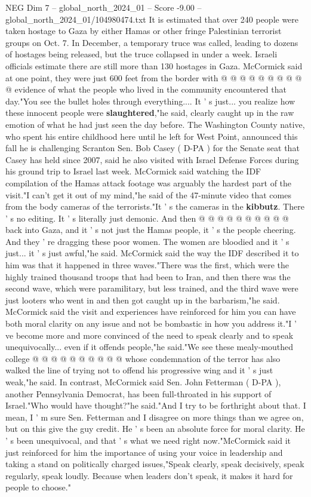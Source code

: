 \begin{textsample}{NEG Dim 7 – global\_north\_2024\_01 – Score -9.00 – global\_north\_2024\_01/104980474.txt}
It is estimated that over 240 people were taken hostage to Gaza by either Hamas or other fringe Palestinian terrorist groups on Oct. 7.
In December, a temporary truce was called, leading to dozens of hostages being released, but the truce collapsed in under a week.
Israeli officials estimate there are still more than 130 hostages in Gaza.
McCormick said at one point, they were just 600 feet from the border with @ @ @ @ @ @ @ @ @ @ evidence of what the people who lived in the community encountered that day."You see the bullet holes through everything....
It ' s just... you realize how these innocent people were \textbf{slaughtered},"he said, clearly caught up in the raw emotion of what he had just seen the day before.
The Washington County native, who spent his entire childhood here until he left for West Point, announced this fall he is challenging Scranton Sen.
Bob Casey ( D-PA ) for the Senate seat that Casey has held since 2007, said he also visited with Israel Defense Forces during his ground trip to Israel last week.
McCormick said watching the IDF compilation of the Hamas attack footage was arguably the hardest part of the visit."I can't get it out of my mind,"he said of the 47-minute video that comes from the body cameras of the terrorists."It ' s the cameras in the \textbf{kibbutz}.
There ' s no editing.
It ' s literally just demonic.
And then @ @ @ @ @ @ @ @ @ @ back into Gaza, and it ' s not just the Hamas people, it ' s the people cheering.
And they ' re dragging these poor women.
The women are bloodied and it ' s just... it ' s just awful,"he said.
McCormick said the way the IDF described it to him was that it happened in three waves."There was the first, which were the highly trained thousand troops that had been to Iran, and then there was the second wave, which were paramilitary, but less trained, and the third wave were just looters who went in and then got caught up in the barbarism,"he said.
McCormick said the visit and experiences have reinforced for him you can have both moral clarity on any issue and not be bombastic in how you address it."I ' ve become more and more convinced of the need to speak clearly and to speak unequivocally... even if it offends people,"he said."We see these mealy-mouthed college @ @ @ @ @ @ @ @ @ @ whose condemnation of the terror has also walked the line of trying not to offend his progressive wing and it ' s just weak,"he said.
In contrast, McCormick said Sen.
John Fetterman ( D-PA ), another Pennsylvania Democrat, has been full-throated in his support of Israel."Who would have thought?"he said."And I try to be forthright about that.
I mean, I ' m sure Sen.
Fetterman and I disagree on more things than we agree on, but on this give the guy credit.
He ' s been an absolute force for moral clarity.
He ' s been unequivocal, and that ' s what we need right now."McCormick said it just reinforced for him the importance of using your voice in leadership and taking a stand on politically charged issues,"Speak clearly, speak decisively, speak regularly, speak loudly.
Because when leaders don't speak, it makes it hard for people to choose."

\end{textsample}

